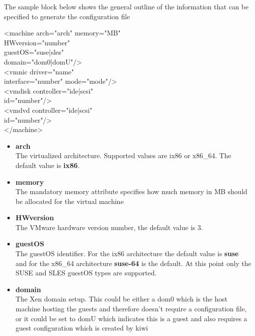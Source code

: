 \begin{itemize}
    The sample block below shows the general outline of the information
    that can be specified to generate the configuration file

	\begin{Command}{12cm}
	<machine arch="arch" memory="MB"\\
	\hspace*{2.5cm}HWversion="number"\\
	\hspace*{2.5cm}guestOS="suse|sles"\\
	\hspace*{2.5cm}domain="dom0|domU"/>\\
	\hspace*{1cm}<vmnic driver="name"\\
	\hspace*{2.5cm}interface="number" mode="mode"/>\\
	\hspace*{1cm}<vmdisk controller="ide|scsi"\\
	\hspace*{2.5cm}id="number"/>\\
	\hspace*{1cm}<vmdvd controller="ide|scsi"\\
	\hspace*{2.5cm}id="number"/>\\
	</machine>
	\end{Command}

	\begin{itemize}
	\item \textbf{arch}\\
      The virtualized architecture. Supported values are ix86 or x86\_64.
      The default value is \textbf{ix86}.
	\item \textbf{memory}\\
      The mandatory memory attribute specifies how much memory in MB
      should be allocated for the virtual machine
	\item \textbf{HWversion}\\
      The VMware hardware version number, the default value is 3.
	\item \textbf{guestOS}\\
      The guestOS identifier. For the ix86 architecture the default 
      value is \textbf{suse} and for the x86\_64 architecture
      \textbf{suse-64} is the default. At this point only the SUSE and
      SLES guestOS types are supported.
	\item \textbf{domain}\\
      The Xen domain setup. This could be either a dom0 which is the
      host machine hosting the guests and therefore doesn't require a
      configuration file, or it could be set to domU which indicates
      this is a guest and also requires a guest configuration which is
      created by kiwi
	\end{itemize}


\end{itemize}
